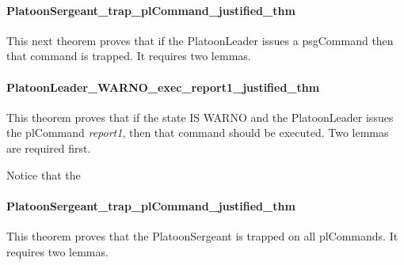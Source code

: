 \documentclass[../../main/main.tex]{subfiles}
\begin{document}
\HOLssmPlanPBTheoremsPlatoonLeaderXXpsgCommandXXnotDiscardXXthm


\paragraph*{PlatoonSergeant_trap_plCommand_justified_thm}
This next theorem proves that if the PlatoonLeader issues a psgCommand then that command is trapped.  It requires two lemmas.

\HOLssmPlanPBTheoremsPlatoonLeaderXXtrapXXpsgCommandXXlemma

\HOLssmPlanPBTheoremsPlatoonLeaderXXtrapXXpsgCommandXXjustifiedXXlemma

\HOLssmPlanPBTheoremsPlatoonSergeantXXtrapXXplCommandXXjustifiedXXthm

\paragraph*{PlatoonLeader_WARNO_exec_report1_justified_thm}
This theorem proves that if the state IS WARNO and the PlatoonLeader issues the plCommand \textit{report1}, then that command should be executed.  Two lemmas are required first.  

Notice that the 

\HOLssmPlanPBTheoremsPlatoonLeaderXXWARNOXXexecXXreportOneXXlemma

\HOLssmPlanPBTheoremsPlatoonLeaderXXWARNOXXexecXXreportOneXXjustifiedXXlemma

\HOLssmPlanPBTheoremsPlatoonLeaderXXWARNOXXexecXXreportOneXXjustifiedXXthm


\paragraph*{PlatoonSergeant_trap_plCommand_justified_thm}
This theorem proves that the PlatoonSergeant is trapped on all plCommands.  It requires two lemmas.

\HOLssmPlanPBTheoremsPlatoonSergeantXXtrapXXplCommandXXlemma

\HOLssmPlanPBTheoremsPlatoonSergeantXXtrapXXplCommandXXjustifiedXXlemma

\HOLssmPlanPBTheoremsPlatoonSergeantXXtrapXXplCommandXXjustifiedXXthm
\end{document}

